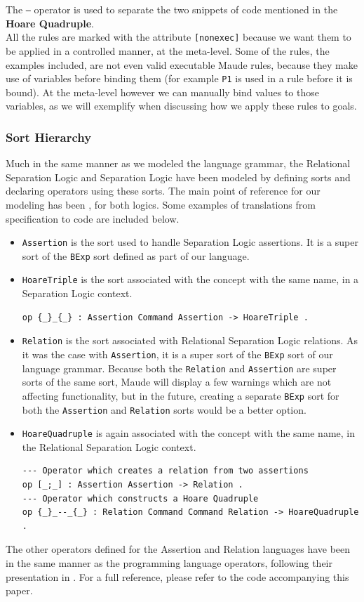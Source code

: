 \documentclass[12pt,a4paper]{article}
\begin{document}
The \texttt{---} operator is used to separate the two snippets of code mentioned in the \textbf{Hoare Quadruple}.
\\

All the rules are marked with the attribute \texttt{[nonexec]} because we want them to be applied in a controlled manner, at the meta-level. Some of the rules, the examples included, are not even valid executable Maude rules, because they make use of variables before binding them (for example \texttt{P1} is used in a rule before it is bound). At the meta-level however we can manually bind values to those variables, as we will exemplify when discussing how we apply these rules to goals.
\subsubsection{Sort Hierarchy}
Much in the same manner as we modeled the language grammar, the Relational Separation Logic \cite{relational} and Separation Logic \cite{SeparationLogic} \cite{primer} have been modeled by defining sorts and declaring operators using these sorts. The main point of reference for our modeling has been \cite{relational}, for both logics. Some examples of translations from specification to code are included below.
\begin{itemize}
	\item \texttt{Assertion} is the sort used to handle Separation Logic assertions. It is a super sort of the \texttt{BExp} sort defined as part of our language.
	\item \texttt{HoareTriple} is the sort associated with the concept with the same name, in a Separation Logic context.
	\begin{lstlisting}[caption=Hoare Triple constructor operator]
op {_}_{_} : Assertion Command Assertion -> HoareTriple .\end{lstlisting}
	\item \texttt{Relation} is the sort associated with Relational Separation Logic relations. As it was the case with \texttt{Assertion}, it is a super sort of the \texttt{BExp} sort of our language grammar. Because both the \texttt{Relation} and \texttt{Assertion} are super sorts of the same sort, Maude will display a few warnings which are not affecting functionality, but in the future, creating a separate \texttt{BExp} sort for both the \texttt{Assertion} and \texttt{Relation} sorts would be a better option.
	\item \texttt{HoareQuadruple} is again associated with the concept with the same name, in the Relational Separation Logic context.
	\begin{lstlisting}[caption=Examples of Relational Separation Logic specific constructs]
--- Operator which creates a relation from two assertions
op [_;_] : Assertion Assertion -> Relation .
--- Operator which constructs a Hoare Quadruple 
op {_}_--_{_} : Relation Command Command Relation -> HoareQuadruple .\end{lstlisting}
\end{itemize}
The other operators defined for the Assertion and Relation languages have been in the same manner as the programming language operators, following their presentation in \cite{relational}. For a full reference, please refer to the code accompanying this paper.
\end{document}
